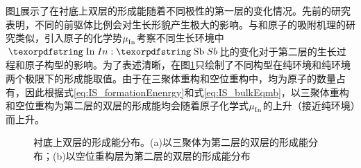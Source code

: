 图\ref{fig:IS_DFT_2LInSb_formationEnergy}展示了在衬底上双层的形成能随着不同极性的第一层的变化情况。先前的研究表明，不同的前驱体比例会对生长形貌产生极大的影响。与和原子的吸附机理的研究类似，引入原子的化学势$\it \mu_{\rm In}^{\rm } \it$考察不同生长环境中$\cemb{In}:\cemb{Sb}$比的变化对于第二层的生长过程和原子构型的影响。为了表述清晰，在图\ref{fig:IS_DFT_2LInSb_formationEnergy}只绘制了不同构型在纯环境和纯环境两个极限下的形成能取值。由于在三聚体重构和空位重构中，均为原子的数量占有，因此根据式\eqref{eq:IS_formationEnenrgy}和式\eqref{eq:IS_bulkEqmb}，以三聚体重构和空位重构为第二层的双层的形成能均会随着原子化学式$\it \mu_{\rm In}^{\rm } \it$的上升（接近纯环境）而上升。

\begin{figure}[htb]
    \caption{衬底上双层的形成能分布。(a)以三聚体为第二层的双层的形成能分布；(b)以空位重构层为第二层的双层的形成能分布}
    \label{fig:IS_DFT_2LInSb_formationEnergy}
\end{figure}


